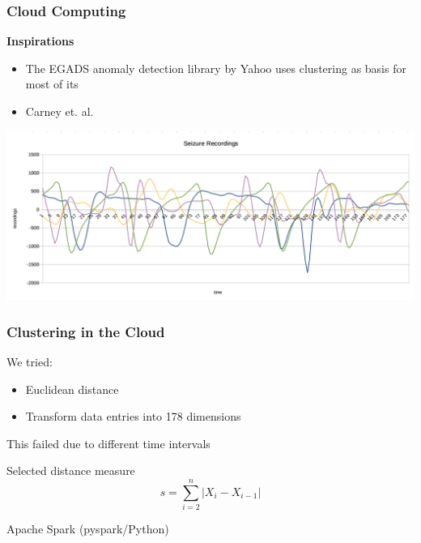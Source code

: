 \documentclass[xelatex,usenames,dvipsnames]{beamer}
\begin{document}
  \begin{frame}
    \frametitle{Cloud Computing}
    \textbf{Inspirations}
    \begin{itemize}
      \item The \textsc{EGADS} anomaly detection library by Yahoo\cite{egads} uses clustering as basis for most of its
      \item Carney et. al.\cite{Carney2011}
    \end{itemize}
  
    \includegraphics[width = \textwidth]{figs/Seizures.png}
    
  \end{frame}

  \begin{frame}
    \frametitle{Clustering in the Cloud}

    We tried:
    \begin{itemize}
      \item Euclidean distance
      \item Transform data entries into 178 dimensions      
    \end{itemize}

    This failed due to different time intervals

    \begin{exampleblock}{Selected distance measure}
      \begin{equation*}
        s = \sum_{i=2}^{n}{\left|X_i - X_{i-1}\right|}
      \end{equation*}
    \end{exampleblock}

    Apache Spark (pyspark/Python)
  
  \end{frame}
\end{document}
